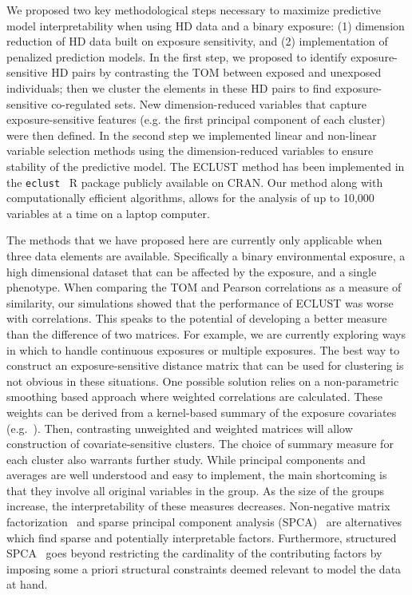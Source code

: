 We proposed two key methodological steps necessary to maximize predictive model interpretability when using HD data and a binary exposure: (1) dimension reduction of HD data built on exposure sensitivity, and (2) implementation of penalized prediction models. In the first step, we proposed to identify exposure-sensitive HD pairs by contrasting the TOM between exposed and unexposed individuals; then we cluster the elements in these HD pairs to find exposure-sensitive co-regulated sets. New dimension-reduced variables that capture exposure-sensitive features (e.g. the first principal component of each cluster) were then defined. In the second step we implemented linear and non-linear variable selection methods using the dimension-reduced variables to ensure stability of the predictive model. The ECLUST method has been implemented in the \texttt{eclust}~\citep{eclust} R package publicly available on CRAN. Our method along with computationally efficient algorithms, allows for the analysis of up to 10,000 variables at a time on a laptop computer.



The methods that we have proposed here are currently only applicable when three data elements are available. Specifically a binary environmental exposure, a high dimensional dataset that can be affected by the exposure, and a single phenotype. When comparing the TOM and Pearson correlations as a measure of similarity, our simulations showed that the performance of ECLUST was worse with correlations. This speaks to the potential of developing a better measure than the difference of two matrices. For example, we are currently exploring ways in which to handle continuous exposures or multiple exposures. The best way to construct an exposure-sensitive distance matrix that can be used for clustering is not obvious in these situations. One possible solution relies on a non-parametric smoothing based approach where weighted correlations are calculated. These weights can be derived from a kernel-based summary of the exposure covariates (e.g.~\citep{qiu2016joint}). Then, contrasting unweighted and weighted matrices will allow construction of covariate-sensitive clusters. The choice of summary measure for each cluster also warrants further study. While principal components and averages are well understood and easy to implement, the main shortcoming is that they involve all original variables in the group. As the size of the groups increase, the interpretability of these measures decreases. Non-negative matrix factorization~\citep{lee2001algorithms} and sparse principal component analysis (SPCA)~\citep{witten2009penalized} are alternatives which find sparse and potentially interpretable factors. Furthermore, structured SPCA~\citep{jenatton2009structured} goes beyond restricting the cardinality of the contributing factors by imposing some a priori structural constraints deemed relevant to model the data at hand.





